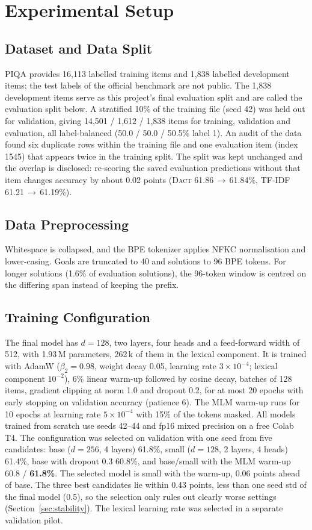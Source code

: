 \documentclass[11pt]{article}
\newcommand{\dact}{\textsc{Dact}}
\begin{document}
\section{Experimental Setup}

\subsection{Dataset and Data Split}
PIQA provides 16{,}113 labelled training items and 1{,}838 labelled development items; the test labels of the official benchmark are not public. The 1{,}838 development items serve as this project's final evaluation split and are called the evaluation split below. A stratified 10\% of the training file (seed 42) was held out for validation, giving 14{,}501 / 1{,}612 / 1{,}838 items for training, validation and evaluation, all label-balanced (50.0 / 50.0 / 50.5\% label 1). An audit of the data found six duplicate rows within the training file and one evaluation item (index 1545) that appears twice in the training split. The split was kept unchanged and the overlap is disclosed: re-scoring the saved evaluation predictions without that item changes accuracy by about 0.02 points (\dact{} 61.86\,$\to$\,61.84\%, TF-IDF 61.21\,$\to$\,61.19\%).

\subsection{Data Preprocessing}
Whitespace is collapsed, and the BPE tokenizer applies NFKC normalisation and lower-casing. Goals are truncated to 40 and solutions to 96 BPE tokens. For longer solutions (1.6\% of evaluation solutions), the 96-token window is centred on the differing span instead of keeping the prefix.

\subsection{Training Configuration}
The final model has $d{=}128$, two layers, four heads and a feed-forward width of 512, with 1.93\,M parameters, 262\,k of them in the lexical component. It is trained with AdamW \cite{loshchilov2019decoupled} ($\beta_2{=}0.98$, weight decay 0.05, learning rate $3{\times}10^{-4}$; lexical component $10^{-2}$), 6\% linear warm-up followed by cosine decay, batches of 128 items, gradient clipping at norm 1.0 and dropout 0.2, for at most 20 epochs with early stopping on validation accuracy (patience 6). The MLM warm-up runs for 10 epochs at learning rate $5{\times}10^{-4}$ with 15\% of the tokens masked. All models trained from scratch use seeds 42--44 and fp16 mixed precision on a free Colab T4. The configuration was selected on validation with one seed from five candidates: base ($d{=}256$, 4 layers) 61.8\%, small ($d{=}128$, 2 layers, 4 heads) 61.4\%, base with dropout 0.3 60.8\%, and base/small with the MLM warm-up 60.8 / \textbf{61.8\%}. The selected model is small with the warm-up, 0.06 points ahead of base. The three best candidates lie within 0.43 points, less than one seed std of the final model (0.5), so the selection only rules out clearly worse settings (Section~\ref{sec:stability}). The lexical learning rate was selected in a separate validation pilot.
\end{document}
